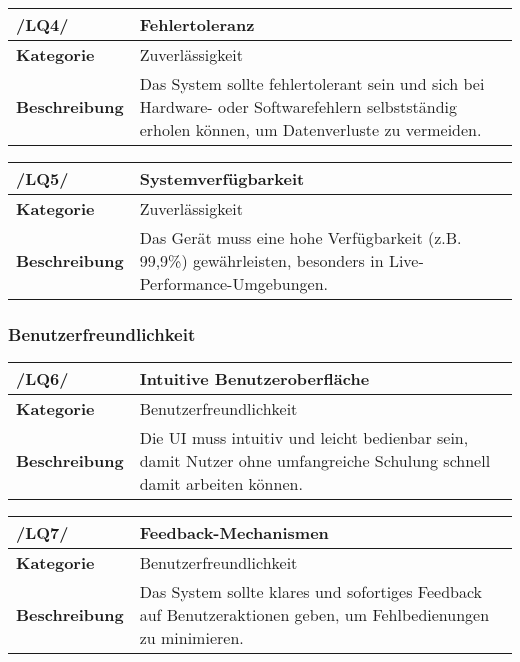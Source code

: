 \begin{table}[h!]
\begin{tabularx}{13cm}{|l|X|}
\hline
\textbf{/LQ4/} & \textbf{Fehlertoleranz} \\ \hline
\textbf{Kategorie} & Zuverlässigkeit \\ \hline
\textbf{Beschreibung} & Das System sollte fehlertolerant sein und sich bei Hardware- oder Softwarefehlern selbstständig erholen können, um Datenverluste zu vermeiden. \\ \hline
\end{tabularx}
\end{table}

\begin{table}[h!]
\begin{tabularx}{13cm}{|l|X|}
\hline
\textbf{/LQ5/} & \textbf{Systemverfügbarkeit} \\ \hline
\textbf{Kategorie} & Zuverlässigkeit \\ \hline
\textbf{Beschreibung} & Das Gerät muss eine hohe Verfügbarkeit (z.B. 99,9\%) gewährleisten, besonders in Live-Performance-Umgebungen. \\ \hline
\end{tabularx}
\end{table}

\newpage
\subsubsection{Benutzerfreundlichkeit}

\begin{table}[h!]
\begin{tabularx}{13cm}{|l|X|}
\hline
\textbf{/LQ6/} & \textbf{Intuitive Benutzeroberfläche} \\ \hline
\textbf{Kategorie} & Benutzerfreundlichkeit \\ \hline
\textbf{Beschreibung} & Die UI muss intuitiv und leicht bedienbar sein, damit Nutzer ohne umfangreiche Schulung schnell damit arbeiten können. \\ \hline
\end{tabularx}
\end{table}

\begin{table}[h!]
\begin{tabularx}{13cm}{|l|X|}
\hline
\textbf{/LQ7/} & \textbf{Feedback-Mechanismen} \\ \hline
\textbf{Kategorie} & Benutzerfreundlichkeit \\ \hline
\textbf{Beschreibung} & Das System sollte klares und sofortiges Feedback auf Benutzeraktionen geben, um Fehlbedienungen zu minimieren. \\ \hline
\end{tabularx}
\end{table}

